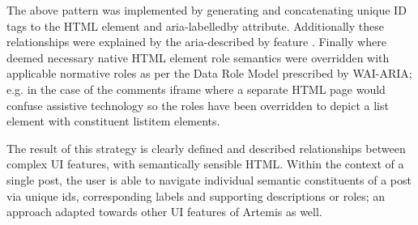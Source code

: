 The above pattern was implemented by generating and concatenating unique ID tags to the HTML element and aria-labelledby attribute. Additionally these relationships were explained by the aria-described by feature \cite{MozillaDeveloperNetworkd}. Finally where deemed necessary native HTML element role semantics were overridden with applicable  normative roles as per the Data Role Model prescribed by WAI-ARIA; e.g. in the case of the comment\textquotesingle s iframe where a separate HTML page would confuse assistive technology so the roles have been overridden to depict a list element with constituent listitem elements.

The result of this strategy is clearly defined and described relationships between complex UI features, with semantically sensible HTML. Within the context of a single post, the user is able to navigate  individual semantic constituents of a post via unique ids, corresponding labels and supporting descriptions or roles; an approach adapted towards other UI features of Artemis as well.
